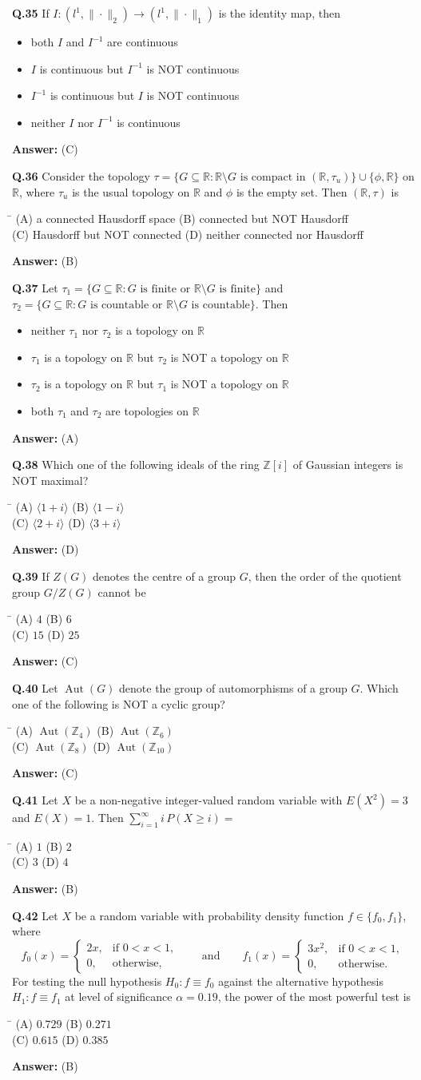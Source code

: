 \documentclass[11pt,a4paper]{article}
\newcommand{\optsfourA}[4]{%
  \begin{tabbing}
    \hspace{0.48\linewidth}\=\kill
    (A) #1 \> (B) #2 \\[2pt]
    (C) #3 \> (D) #4
  \end{tabbing}%
}
\newcommand{\optslistA}[4]{%
  \begin{itemize}
    \setlength{\itemsep}{2pt}\setlength{\parskip}{0pt}
    \item[(A)] #1
    \item[(B)] #2
    \item[(C)] #3
    \item[(D)] #4
  \end{itemize}%
}
\newcommand{\ans}[1]{\textbf{Answer:} #1\par\medskip}
\begin{document}
\textbf{Q.35} If $I : (l^1, \|\cdot\|_2) \to (l^1, \|\cdot\|_1)$ is the identity map, then
\optslistA{both $I$ and $I^{-1}$ are continuous}{$I$ is continuous but $I^{-1}$ is NOT continuous}{$I^{-1}$ is continuous but $I$ is NOT continuous}{neither $I$ nor $I^{-1}$ is continuous}
\ans{(C)}

\textbf{Q.36} Consider the topology $\tau = \{G \subseteq \mathbb{R} : \mathbb{R} \setminus G \text{ is compact in } (\mathbb{R}, \tau_u)\} \cup \{\phi, \mathbb{R}\}$ on $\mathbb{R}$, where $\tau_u$ is the usual topology on $\mathbb{R}$ and $\phi$ is the empty set. Then $(\mathbb{R}, \tau)$ is
\optsfourA{a connected Hausdorff space}{connected but NOT Hausdorff}{Hausdorff but NOT connected}{neither connected nor Hausdorff}
\ans{(B)}

\textbf{Q.37} Let $\tau_1 = \{G \subseteq \mathbb{R} : G \text{ is finite or } \mathbb{R} \setminus G \text{ is finite}\}$ and $\tau_2 = \{G \subseteq \mathbb{R} : G \text{ is countable or } \mathbb{R} \setminus G \text{ is countable}\}$. Then
\optslistA{neither $\tau_1$ nor $\tau_2$ is a topology on $\mathbb{R}$}{$\tau_1$ is a topology on $\mathbb{R}$ but $\tau_2$ is NOT a topology on $\mathbb{R}$}{$\tau_2$ is a topology on $\mathbb{R}$ but $\tau_1$ is NOT a topology on $\mathbb{R}$}{both $\tau_1$ and $\tau_2$ are topologies on $\mathbb{R}$}
\ans{(A)}

\textbf{Q.38} Which one of the following ideals of the ring $\mathbb{Z}[i]$ of Gaussian integers is NOT maximal?
\optsfourA{$\langle 1 + i \rangle$}{$\langle 1 - i \rangle$}{$\langle 2 + i \rangle$}{$\langle 3 + i \rangle$}
\ans{(D)}

\textbf{Q.39} If $Z(G)$ denotes the centre of a group $G$, then the order of the quotient group $G / Z(G)$ cannot be
\optsfourA{$4$}{$6$}{$15$}{$25$}
\ans{(C)}

\textbf{Q.40} Let $\operatorname{Aut}(G)$ denote the group of automorphisms of a group $G$. Which one of the following is NOT a cyclic group?
\optsfourA{$\operatorname{Aut}(\mathbb{Z}_4)$}{$\operatorname{Aut}(\mathbb{Z}_6)$}{$\operatorname{Aut}(\mathbb{Z}_8)$}{$\operatorname{Aut}(\mathbb{Z}_{10})$}
\ans{(C)}

\textbf{Q.41} Let $X$ be a non-negative integer-valued random variable with $E(X^2) = 3$ and $E(X) = 1$. Then $\displaystyle\sum_{i=1}^{\infty} i\, P(X \ge i) =$
\optsfourA{$1$}{$2$}{$3$}{$4$}
\ans{(B)}

\textbf{Q.42} Let $X$ be a random variable with probability density function $f \in \{f_0, f_1\}$, where
\[
  f_0(x) = \begin{cases} 2x, & \text{if } 0 < x < 1, \\ 0, & \text{otherwise,} \end{cases}
  \qquad \text{and} \qquad
  f_1(x) = \begin{cases} 3x^2, & \text{if } 0 < x < 1, \\ 0, & \text{otherwise.} \end{cases}
\]
For testing the null hypothesis $H_0 : f \equiv f_0$ against the alternative hypothesis $H_1 : f \equiv f_1$ at level of significance $\alpha = 0.19$, the power of the most powerful test is
\optsfourA{$0.729$}{$0.271$}{$0.615$}{$0.385$}
\ans{(B)}
\end{document}

